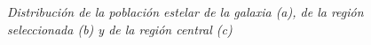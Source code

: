 \documentclass{article}
\begin{document}
\begin{figure}[H]
	\centering
	\caption{\emph{Distribución de la población estelar de la galaxia (a), de la región seleccionada (b) y de la región central (c)}}
	\label{figura 8}
\end{figure} 
\end{document}

